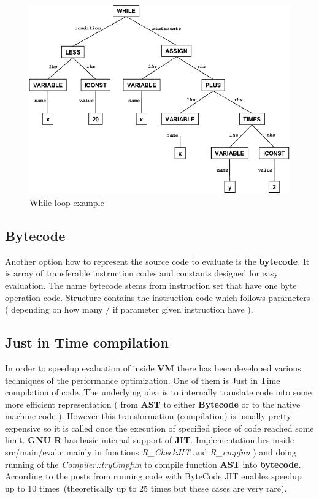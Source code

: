 \documentclass[thesis=M,english]{FITthesis}[2018/10/20]
\begin{document}
\begin{figure}\centering
	\includegraphics{Abstract-syntax-tree-of-the-while-loop}
	\caption{While loop example}\label{fig:ast-while}
\end{figure}

\subsection{Bytecode}\label{BC}

Another option how to represent the source code to evaluate is the \textbf{bytecode}. It is array of transferable instruction codes and constants designed for easy evaluation. The name bytecode stems from instruction set that have one byte operation code. Structure contains the instruction code which follows parameters ( depending on how many / if parameter given instruction have ).

\subsection{Just in Time compilation}\label{JIT}

In order to speedup evaluation of inside \textbf{VM} there has been developed various techniques of the performance optimization. One of them is Just in Time compilation of code. The underlying idea is to internally translate code into some more efficient representation ( from \textbf{AST} to either \textbf{Bytecode} or to the native machine code ). However this transformation (compilation) is usually pretty expensive so it is called once the execution of specified piece of code reached some limit.
\textbf{GNU R} has basic internal support of \textbf{JIT}. Implementation lies inside src/main/eval.c mainly in functions \textit{R{\_}CheckJIT} and \textit{R{\_}cmpfun} ) and doing running of the \textit{Compiler::tryCmpfun} to compile function \textbf{AST} into \textbf{bytecode}. According to the posts from running code with ByteCode JIT enables speedup up to 10 times~(theoretically up to 25 times but these cases are very rare).
\end{document}
